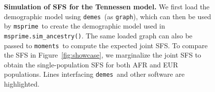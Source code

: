 \documentclass[11pt]{article}
\newcommand{\msprime}[0]{\texttt{msprime}}
\newcommand{\demes}[0]{\texttt{demes}}
\newcommand{\moments}[0]{\texttt{moments}}
\begin{document}
\begin{figure}[h!]
    \begin{tcolorbox}
        \inputminted[fontsize=\scriptsize,numbersep=5pt,highlightlines={9,19,52}]{python}{models/tennessen-simulation.py}
    \end{tcolorbox}
    \caption{
        \textbf{Simulation of SFS for the Tennessen model.}
        We first load the demographic model using \demes\ (as \texttt{graph}),
        which can then be used by \msprime\ to create the demographic model used in
        \texttt{msprime.sim\_ancestry()}. The same loaded graph can also be
        passed to \moments\ to compute the expected joint SFS.
        To compare the SFS in Figure~\ref{fig:showcase}, we marginalize the
        joint SFS to obtain the single-population SFS for both AFR and EUR populations.
        Lines interfacing \demes\ and other software are highlighted.
    }
    \label{fig:tennessen-simulation}
\end{figure}
\end{document}
